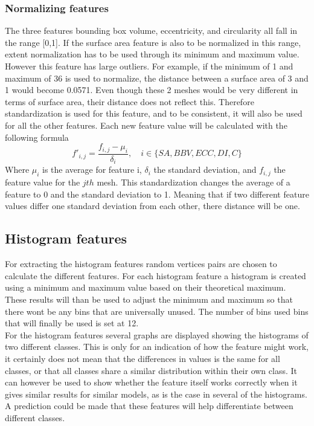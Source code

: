 \documentclass{bigdata}
\begin{document}
\subsubsection{Normalizing  features}
The three features bounding box volume, eccentricity, and circularity all fall in the range [0,1]. If the surface area feature is also to be normalized in this range, extent normalization has to be used through its minimum and maximum value. However this feature has large outliers. For example, if the minimum of 1 and maximum of 36 is used to normalize, the distance between a surface area of 3 and 1 would become 0.0571. Even though these 2 meshes would be very different in terms of surface area, their distance does not reflect this. Therefore standardization is used for this feature, and to be consistent, it will also be used for all the other  features. 
Each new feature value will be calculated with the following formula
\begin{equation}
f'_{i,j} = \frac{f_{i,j} - \mu_i}{\delta_i},\quad i \in \{SA,BBV,ECC,DI,C\}
\end{equation}
Where $\mu_i$ is the average for feature i, $\delta_i$ the standard deviation, and $f_{i,j}$ the feature value for the $jth$ mesh. This standardization changes the average of a feature to 0 and the standard deviation to 1. Meaning that if two different feature values differ one standard deviation from each other, there distance will be one. 

\subsection{Histogram features}
For extracting the histogram features random vertices pairs are chosen to calculate the different features. For each histogram feature a histogram is created using a minimum and maximum value based on their theoretical maximum. These results will than be used to adjust the minimum and maximum so that there wont be any bins that are universally unused. The number of bins used bins that will finally be used is set at 12.\\
For the histogram features several graphs are displayed showing the histograms of two different classes. This is only for an indication of how the feature might work, it certainly does not mean that the differences in values is the same for all classes, or that all classes share a similar distribution within their own class. It can however be used to show whether the feature itself works correctly when it gives similar results for similar models, as is the case in several of the histograms. A prediction could be made that these features will help differentiate between different classes. 
\end{document}
